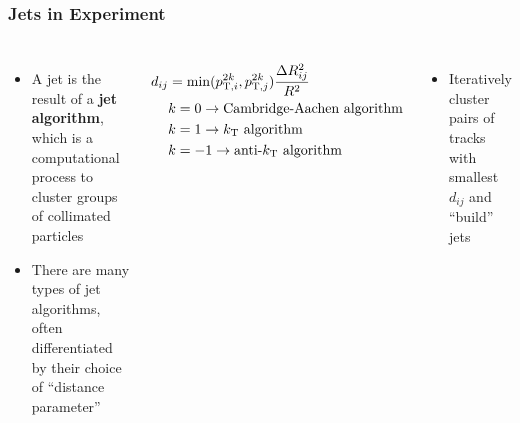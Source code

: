 \begin{frame}
  \frametitle{\textbf{Jets in Experiment}}
  \begin{columns}
    \begin{itemize}
    \item A jet is the result of a \textbf{jet algorithm}, which is a computational process to cluster groups of collimated particles
    \item There are many types of jet algorithms, often differentiated by their choice of ``distance parameter''
    \end{itemize}
    \begin{align*}
      d_{ij} &= \min(p_{\text{T},i}^{2k},p_{\text{T},j}^{2k} )\cfrac{\Delta R_{ij}^2}{R^2} \\
      &k = 0 \to \text{Cambridge-Aachen algorithm} \\
        &k = 1 \to k_{\text{T}} \text{ algorithm} \\
          &k = -1 \to \text{anti-}k_{\text{T}} \text{ algorithm} \\
    \end{align*}
    \begin{itemize}
    \item Iteratively cluster pairs of tracks with smallest $d_{ij}$ and ``build'' jets
    \end{itemize}

    \centering

    \centering

    \centering
  \end{columns}
\end{frame}
